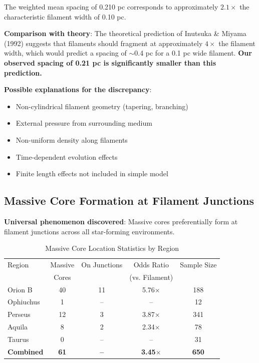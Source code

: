 \documentclass[11pt,a4paper]{article}
\begin{document}
The weighted mean spacing of 0.210 pc corresponds to approximately \textbf{$2.1\times$} the characteristic filament width of 0.10 pc.

\textbf{Comparison with theory}: The theoretical prediction of Inutsuka \& Miyama (1992) suggests that filaments should fragment at approximately $4\times$ the filament width, which would predict a spacing of $\sim$0.4 pc for a 0.1 pc wide filament. \textbf{Our observed spacing of 0.21 pc is significantly smaller than this prediction.}

\textbf{Possible explanations for the discrepancy}:
\begin{itemize}
    \item Non-cylindrical filament geometry (tapering, branching)
    \item External pressure from surrounding medium
    \item Non-uniform density along filaments
    \item Time-dependent evolution effects
    \item Finite length effects not included in simple model
\end{itemize}

\subsection{Massive Core Formation at Filament Junctions}

\textbf{Universal phenomenon discovered}: Massive cores preferentially form at filament junctions across all star-forming environments.

\begin{table}[H]
\centering
\caption{Massive Core Location Statistics by Region}
\begin{tabular}{lcccc}
\toprule
Region & Massive & On Junctions & Odds Ratio & Sample Size \\
      & Cores &  & (vs. Filament) &  \\
\midrule
Orion B   & 40  & 11  & 5.76$\times$ & 188 \\
Ophiuchus& 1   & --  & -- & 12 \\
Perseus  & 12  & 3   & 3.87$\times$ & 341 \\
Aquila   & 8   & 2   & 2.34$\times$ & 78 \\
Taurus   & 0   & --  & -- & 31 \\
\midrule
\textbf{Combined} & \textbf{61} & \textbf{--} & \textbf{3.45$\times$} & \textbf{650} \\
\bottomrule
\end{tabular}
\end{table}
\end{document}
